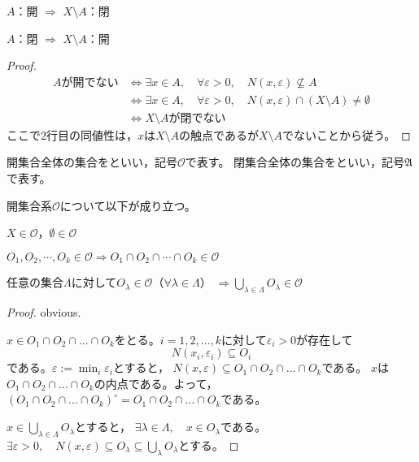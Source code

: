 \documentclass[uplatex]{jsarticle}
\begin{document}
\begin{prop}
     $A$：開 $\Longrightarrow$ $X \setminus A$：閉

     $A$：閉 $\Longrightarrow$ $X \setminus A$：開
\end{prop}

\begin{proof}
    \begin{align*}
        A\text{が開でない} & \Longleftrightarrow \exists x \in A, \quad \forall \varepsilon > 0, \quad N(x, \varepsilon) \not\subseteq A \\
        & \Longleftrightarrow \exists x \in A, \quad \forall \varepsilon > 0, \quad N(x, \varepsilon) \cap (X \setminus A) \neq \emptyset \\
        & \Longleftrightarrow X \setminus A \text{が閉でない}
    \end{align*}
    ここで2行目の同値性は，$x$は$X \setminus A$の触点であるが$X \setminus A$でないことから従う。
\end{proof}

開集合全体の集合をといい，記号$\mathcal{O}$で表す。
閉集合全体の集合をといい，記号$\mathfrak{A}$で表す。

\begin{prop}
    \label{prop:open_set_axiom}
    開集合系$\mathcal{O}$について以下が成り立つ。

     $X \in \mathcal{O}$，$\emptyset \in \mathcal{O}$

     $O_{1}, O_{2}, \cdots, O_{k} \in \mathcal{O} \Longrightarrow O_{1} \cap O_{2} \cap \cdots \cap O_{k} \in \mathcal{O}$

     任意の集合$\Lambda$に対して$O_{\lambda} \in \mathcal{O}$（$\forall \lambda \in \Lambda$） ${\displaystyle \Longrightarrow \bigcup_{\lambda \in \Lambda} O_{\lambda} \in \mathcal{O}}$
\end{prop}

\begin{proof}
     obvious.

     $x \in O_{1} \cap O_{2} \cap \dots \cap O_{k}$をとる。$i = 1,2,\dots,k$に対して$\varepsilon_{i} > 0$が存在して
    \begin{equation}
        N(x_{i}, \varepsilon_{i}) \subseteq O_{i}
    \end{equation}
    である。${\displaystyle \varepsilon := \min_{i} \varepsilon_{i}}$とすると，
    $N(x, \varepsilon) \subseteq O_{1} \cap O_{2} \cap \dots \cap O_{k}$である。
    $x$は$O_{1} \cap O_{2} \cap \dots \cap O_{k}$の内点である。よって，$\left( O_{1} \cap O_{2} \cap \dots \cap O_{k} \right)^{\circ} = O_{1} \cap O_{2} \cap \dots \cap O_{k}$である。

     ${x \in \displaystyle \bigcup_{\lambda \in \Lambda} O_{\lambda}}$とすると，
    $\exists \lambda \in \Lambda, \quad x \in O_{\lambda}$である。${\displaystyle \exists \varepsilon > 0, \quad N(x, \varepsilon) \subseteq O_{\lambda} \subseteq \bigcup_{\lambda} O_{\lambda}}$とする。
\end{proof}
\end{document}
